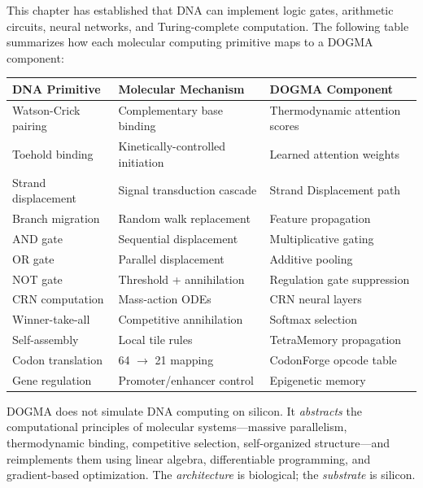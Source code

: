 This chapter has established that DNA can implement logic gates, arithmetic circuits, neural networks, and Turing-complete computation. The following table summarizes how each molecular computing primitive maps to a DOGMA component:

\begin{center}
\renewcommand{\arraystretch}{1.18}
\begin{tabularx}{0.98\textwidth}{L{3.2cm} L{3.5cm} Y}
\toprule
\textbf{DNA Primitive} & \textbf{Molecular Mechanism} & \textbf{DOGMA Component} \\
\midrule
Watson-Crick pairing & Complementary base binding & Thermodynamic attention scores \\
Toehold binding & Kinetically-controlled initiation & Learned attention weights \\
Strand displacement & Signal transduction cascade & Strand Displacement path \\
Branch migration & Random walk replacement & Feature propagation \\
AND gate & Sequential displacement & Multiplicative gating \\
OR gate & Parallel displacement & Additive pooling \\
NOT gate & Threshold + annihilation & Regulation gate suppression \\
CRN computation & Mass-action ODEs & CRN neural layers \\
Winner-take-all & Competitive annihilation & Softmax selection \\
Self-assembly & Local tile rules & TetraMemory propagation \\
Codon translation & 64 $\to$ 21 mapping & CodonForge opcode table \\
Gene regulation & Promoter/enhancer control & Epigenetic memory \\
\bottomrule
\end{tabularx}
\end{center}

\begin{keyinsight}
DOGMA does not simulate DNA computing on silicon. It \emph{abstracts} the computational principles of molecular systems---massive parallelism, thermodynamic binding, competitive selection, self-organized structure---and reimplements them using linear algebra, differentiable programming, and gradient-based optimization. The \emph{architecture} is biological; the \emph{substrate} is silicon.
\end{keyinsight}

